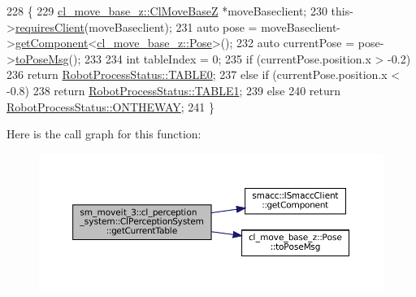 \begin{DoxyCode}
228   \{
229     \hyperlink{classcl__move__base__z_1_1ClMoveBaseZ}{cl\_move\_base\_z::ClMoveBaseZ} *moveBaseclient;
230     this->\hyperlink{classsmacc_1_1ISmaccClient_a7a9990a2f3e35d547671188d69fee520}{requiresClient}(moveBaseclient);
231     \textcolor{keyword}{auto} pose = moveBaseclient->\hyperlink{classsmacc_1_1ISmaccClient_adef78db601749ca63c19e74a27cb88cc}{getComponent}<\hyperlink{classcl__move__base__z_1_1Pose}{cl\_move\_base\_z::Pose}>();
232     \textcolor{keyword}{auto} currentPose = pose->\hyperlink{classcl__move__base__z_1_1Pose_a9faf8c6b437ff6b19c8bddd692908dca}{toPoseMsg}();
233 
234     \textcolor{keywordtype}{int} tableIndex = 0;
235     \textcolor{keywordflow}{if} (currentPose.position.x > -0.2)
236       \textcolor{keywordflow}{return} \hyperlink{namespacesm__moveit__3_1_1cl__perception__system_a627f57ce4b1b2a0daa56d1b3c51c37eca1fd65c0ced0ead229bf6dd6a59067a4f}{RobotProcessStatus::TABLE0};
237     \textcolor{keywordflow}{else} \textcolor{keywordflow}{if} (currentPose.position.x < -0.8)
238       \textcolor{keywordflow}{return} \hyperlink{namespacesm__moveit__3_1_1cl__perception__system_a627f57ce4b1b2a0daa56d1b3c51c37eca5b22e42e5d94a94037a4486a4976c49d}{RobotProcessStatus::TABLE1};
239     \textcolor{keywordflow}{else}
240       \textcolor{keywordflow}{return} \hyperlink{namespacesm__moveit__3_1_1cl__perception__system_a627f57ce4b1b2a0daa56d1b3c51c37eca92f7ea3097b3fdb1b7a25669cfc1b8bd}{RobotProcessStatus::ONTHEWAY};
241   \}
\end{DoxyCode}
Here is the call graph for this function\+:
\nopagebreak
\begin{figure}[H]
\begin{center}
\leavevmode
\includegraphics[width=350pt]{classsm__moveit__3_1_1cl__perception__system_1_1ClPerceptionSystem_a6abfb0c37f72ea92986d3d007f668dbb_cgraph}
\end{center}
\end{figure}
\mbox{\label{classsm__moveit__3_1_1cl__perception__system_1_1ClPerceptionSystem_a852bf07fda7da87e7bb4ad9336e25042}} 
